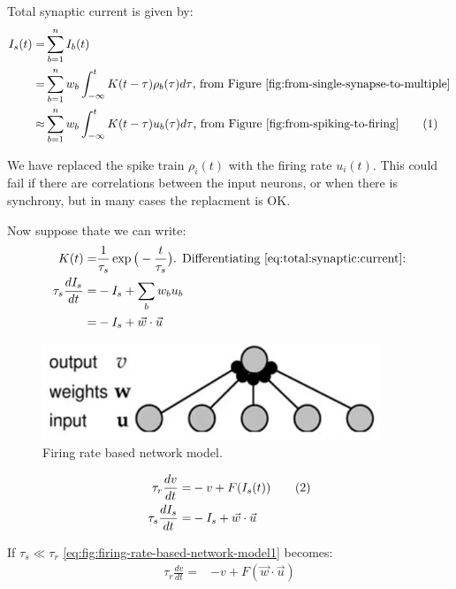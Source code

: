 \documentclass[]{article}
\newcommand\numberthis{\addtocounter{equation}{1}\tag{\theequation}}
\begin{document}
Total synaptic current is given by:
\begin{align*}
	I_s(t) =& \sum_{b=1}^{n} I_b(t)\\
	=&  \sum_{b=1}^{n} w_b \int_{-\infty}^{t} K(t-\tau) \rho_b(\tau) d\tau \text{, from Figure \ref{fig:from-single-synapse-to-multiple}}\\
	\approx & \sum_{b=1}^{n} w_b \int_{-\infty}^{t} K(t-\tau) u_b(\tau) d\tau \text{, from Figure \ref{fig:from-spiking-to-firing}} \numberthis \label{eq:total:synaptic:current}
\end{align*}

We have replaced the spike train $\rho_i(t)$ with the firing rate $u_i(t)$. This could fail if there are correlations between the input neurons, or when there is synchrony, but in many cases the replacment is OK.

Now suppose thate we can write:
\begin{align*}
	K(t) =& \frac{1}{\tau_s} \exp \big(-\frac{t}{\tau_s}\big)\text{. Differentiating \eqref{eq:total:synaptic:current}:}\\
	\tau_s \frac{dI_s}{dt} =& -I_s + \sum_b w_b u_b\\
	=&  -I_s +\vec{w} \cdot \vec{u}
\end{align*}

\begin{figure}[H]
	\begin{center}
		\caption{Firing rate based network model.}\label{fig:firing-rate-based-network-model}
		\includegraphics[width=0.9\textwidth]{firing-rate-based-network-model}
	\end{center}
\end{figure}

\begin{align*}
	\tau_r \frac{dv}{dt} =& -v + F(I_s(t)) \numberthis \label{eq:fig:firing-rate-based-network-model1} \\ 
	\tau_s \frac{dI_s}{dt} =&  -I_s +\vec{w} \cdot \vec{u}
\end{align*}

If $\tau_s \ll \tau_r$ \eqref{eq:fig:firing-rate-based-network-model1} becomes:
\begin{align*}
	\tau_r \frac{dv}{dt} =& -v + F(\vec{w} \cdot \vec{u})
\end{align*}
\end{document}
